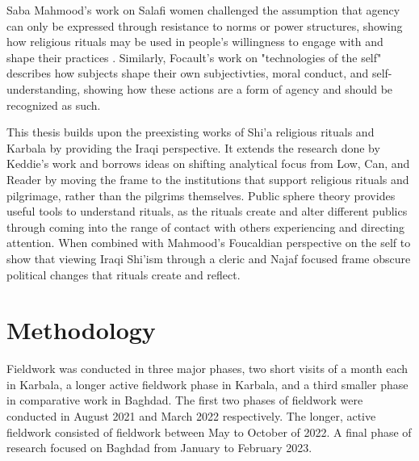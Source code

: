 Saba Mahmood's work on Salafi women challenged the assumption that agency can only be expressed through resistance to norms or power structures, showing how religious rituals may be used in people's willingness to engage with and shape their practices \cite{mahmood_politics_2005}. Similarly, Focault's work on "technologies of the self" describes how subjects shape their own subjectivties, moral conduct, and self-understanding, showing how these actions are a form of agency and should be recognized as such\cite{foucault_technologies_1988}.


This thesis builds upon the preexisting works of Shi'a religious rituals and Karbala by providing the Iraqi perspective. It extends the research done by Keddie's work and borrows ideas on shifting analytical focus from Low, Can, and Reader by moving the frame to the institutions that support religious rituals and pilgrimage, rather than the pilgrims themselves. Public sphere theory provides useful tools to understand rituals, as the rituals create and alter different publics through coming into the range of contact with others experiencing and directing attention. When combined with Mahmood's Foucaldian perspective on the self to show that viewing Iraqi Shi'ism through a cleric and Najaf focused frame obscure political changes that rituals create and reflect.

\section{Methodology}
Fieldwork was conducted in three major phases, two short visits of a month each in Karbala, a longer active fieldwork phase in Karbala, and a third smaller phase in comparative work in Baghdad. The first two phases of fieldwork were conducted in August 2021 and March 2022 respectively. The longer, active fieldwork consisted of fieldwork between May to October of 2022. A final phase of research focused on Baghdad from January to February 2023. 


